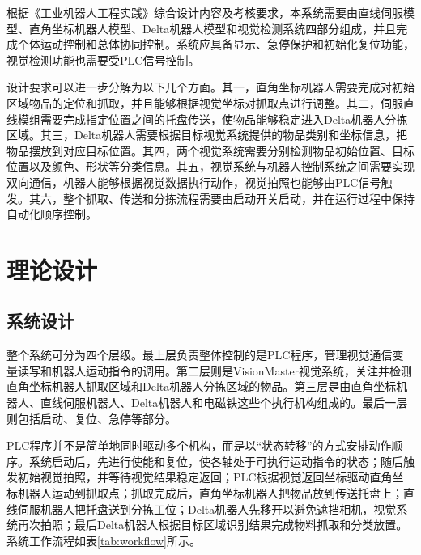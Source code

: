 \documentclass[UTF8,a4paper,12pt,fontset=windows]{ctexart}
\begin{document}
根据《工业机器人工程实践》综合设计内容及考核要求，本系统需要由直线伺服模型、直角坐标机器人模型、Delta机器人模型和视觉检测系统四部分组成，并且完成个体运动控制和总体协同控制。系统应具备显示、急停保护和初始化复位功能，视觉检测功能也需要受PLC信号控制。

设计要求可以进一步分解为以下几个方面。其一，直角坐标机器人需要完成对初始区域物品的定位和抓取，并且能够根据视觉坐标对抓取点进行调整。其二，伺服直线模组需要完成指定位置之间的托盘传送，使物品能够稳定进入Delta机器人分拣区域。其三，Delta机器人需要根据目标视觉系统提供的物品类别和坐标信息，把物品摆放到对应目标位置。其四，两个视觉系统需要分别检测物品初始位置、目标位置以及颜色、形状等分类信息。其五，视觉系统与机器人控制系统之间需要实现双向通信，机器人能够根据视觉数据执行动作，视觉拍照也能够由PLC信号触发。其六，整个抓取、传送和分拣流程需要由启动开关启动，并在运行过程中保持自动化顺序控制。

\section{理论设计}

\subsection{系统设计}

整个系统可分为四个层级。最上层负责整体控制的是PLC程序，管理视觉通信变量读写和机器人运动指令的调用。第二层则是VisionMaster视觉系统，关注并检测直角坐标机器人抓取区域和Delta机器人分拣区域的物品。第三层是由直角坐标机器人、直线伺服机器人、Delta机器人和电磁铁这些个执行机构组成的。最后一层则包括启动、复位、急停等部分。

PLC程序并不是简单地同时驱动多个机构，而是以“状态转移”的方式安排动作顺序。系统启动后，先进行使能和复位，使各轴处于可执行运动指令的状态；随后触发初始视觉拍照，并等待视觉结果稳定返回；PLC根据视觉返回坐标驱动直角坐标机器人运动到抓取点；抓取完成后，直角坐标机器人把物品放到传送托盘上；直线伺服机器人把托盘送到分拣工位；Delta机器人先移开以避免遮挡相机，视觉系统再次拍照；最后Delta机器人根据目标区域识别结果完成物料抓取和分类放置。系统工作流程如表\ref{tab:workflow}所示。
\end{document}
